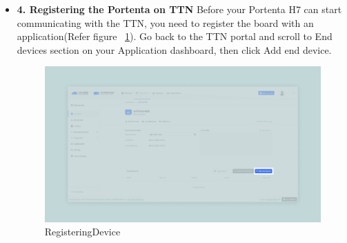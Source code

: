 \begin{itemize}
	The only line you may need to change before uploading the code is the one that sets the frequency. Set the frequency code according to your country if needed. You can find more information about frequency by country at this TTN link.
	
	\begin{lstlisting}[language=C++, frame=single, numbers=left, basicstyle=\ttfamily\small]
		// change this to your regional band (eg. US915, AS923, ...)
		if (!modem.begin(EU868)) {    ...
		\end{lstlisting}
		
		Once you have added to the sketch the frequency according to your country, you can upload it to the board. Then, when the upload is completed, open the Serial Monitor. The following details will show up:
		
		\begin{lstlisting}[language=C++, frame=single, numbers=left, basicstyle=\ttfamily\small]
			Your module version is: ARD-078 1.2.1
			Your device EUI is: a8xxxxxxxxxxxxxx
			Are you connecting via OTAA (1) or ABP (2)?
		\end{lstlisting}
		
		In order to select the way in which the board is going to connect with TTN (OTAA or ABP), you need to configure it on the TTN portal. You will see which option you should select in the following steps. \cite{ArduinoTTN:2024} 
		
		\item \textbf{4. Registering the Portenta on TTN} Before your Portenta H7 can start communicating with the TTN, you need to register the board with an application(Refer figure ~\ref{RegisteringDevice}). Go back to the TTN portal and scroll to End devices section on your Application dashboard, then click Add end device. \cite{ArduinoTTN:2024} 
		
		\begin{figure}
			\begin{center}
				\includegraphics[width=0.7\linewidth]{Images/LORA/RegisteringDevice.png}
				\caption{RegisteringDevice}
				\label{RegisteringDevice} 
			\end{center}
		\end{figure}
		

\end{itemize}
